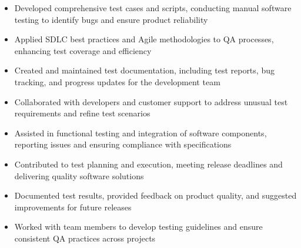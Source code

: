 \par\smallskip
\noindent
\begin{minipage}{20cm}
  \begin{minipage}{9.75cm}
    \begin{itemize}
      \item Developed comprehensive test cases and scripts, conducting manual software testing to identify bugs and ensure product reliability
      \item Applied SDLC best practices and Agile methodologies to QA processes, enhancing test coverage and efficiency
    \end{itemize}
  \end{minipage}
  \hfill
  \begin{minipage}{9.75cm}
    \begin{itemize}
      \item Created and maintained test documentation, including test reports, bug tracking, and progress updates for the development team
      \item Collaborated with developers and customer support to address unusual test requirements and refine test scenarios
    \end{itemize}
  \end{minipage}
\end{minipage}
\par\smallskip
\divider

\par\smallskip
\noindent
\begin{minipage}{20cm}
  \begin{minipage}{9.75cm}
    \begin{itemize}
      \item Assisted in functional testing and integration of software components, reporting issues and ensuring compliance with specifications
      \item Contributed to test planning and execution, meeting release deadlines and delivering quality software solutions
    \end{itemize}
  \end{minipage}
  \hfill
  \begin{minipage}{9.75cm}
    \begin{itemize}
      \item Documented test results, provided feedback on product quality, and suggested improvements for future releases
      \item Worked with team members to develop testing guidelines and ensure consistent QA practices across projects
    \end{itemize}
  \end{minipage}
\end{minipage}

